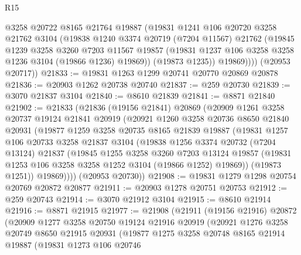 \begin{lexlean}{R15}
\begin{coremodule}
            @3258
            @20722
            @8165
            @21764
            @19887
            (@19831
              @1241
              @106
              @20720
              @3258
              @21762
              @3104
              (@19838
                @1240
                @3374
                @20719
                (@7204 @11567)
                @21762
                (@19845
                  @1239
                  @3258
                  @3260
                  @7203
                  @11567
                  @19857
                  (@19831 @1237 @106 @3258 @3258 @1236 @3104 (@19866 @1236) @19869))
                (@19873 @1235))
              @19869))))
      (@20953 @20717))
@21833 := @19831 @1263 @1299 @20741 @20770 @20869 @20878
@21836 := @20903 @1262 @20738 @20740
@21837 := @259 @20730
@21839 := @3070 @21837 @3104
@21840 := @8610 @21839
@21841 := @8871 @21840
@21902 := @21833
    (@21836
      (@19156 @21841)
      @20869
      (@20909
        @1261
        @3258
        @20737
        @19124
        @21841
        @20919
        (@20921
          @1260
          @3258
          @20736
          @8650
          @21840
          @20931
          (@19877
            @1259
            @3258
            @20735
            @8165
            @21839
            @19887
            (@19831
              @1257
              @106
              @20733
              @3258
              @21837
              @3104
              (@19838
                @1256
                @3374
                @20732
                (@7204 @13124)
                @21837
                (@19845
                  @1255
                  @3258
                  @3260
                  @7203
                  @13124
                  @19857
                  (@19831 @1253 @106 @3258 @3258 @1252 @3104 (@19866 @1252) @19869))
                (@19873 @1251))
              @19869))))
      (@20953 @20730))
@21908 := @19831 @1279 @1298 @20754 @20769 @20872 @20877
@21911 := @20903 @1278 @20751 @20753
@21912 := @259 @20743
@21914 := @3070 @21912 @3104
@21915 := @8610 @21914
@21916 := @8871 @21915
@21977 := @21908
    (@21911
      (@19156 @21916)
      @20872
      (@20909
        @1277
        @3258
        @20750
        @19124
        @21916
        @20919
        (@20921
          @1276
          @3258
          @20749
          @8650
          @21915
          @20931
          (@19877
            @1275
            @3258
            @20748
            @8165
            @21914
            @19887
            (@19831
              @1273
              @106
              @20746

\end{coremodule}
\end{lexlean}
